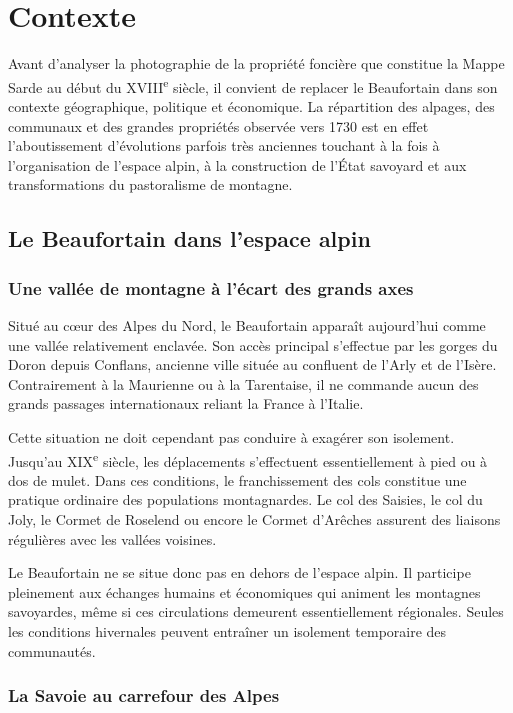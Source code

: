 \documentclass[12pt,a4paper]{report}
\begin{document}
	
\chapter{Contexte}

Avant d'analyser la photographie de la propriété foncière que constitue la Mappe Sarde au début du XVIII\textsuperscript{e} siècle, il convient de replacer le Beaufortain dans son contexte géographique, politique et économique. La répartition des alpages, des communaux et des grandes propriétés observée vers 1730 est en effet l'aboutissement d'évolutions parfois très anciennes touchant à la fois à l'organisation de l'espace alpin, à la construction de l'État savoyard et aux transformations du pastoralisme de montagne.

\section{Le Beaufortain dans l'espace alpin}

\subsection{Une vallée de montagne à l'écart des grands axes}

Situé au cœur des Alpes du Nord, le Beaufortain apparaît aujourd'hui comme une vallée relativement enclavée. Son accès principal s'effectue par les gorges du Doron depuis Conflans, ancienne ville située au confluent de l'Arly et de l'Isère. Contrairement à la Maurienne ou à la Tarentaise, il ne commande aucun des grands passages internationaux reliant la France à l'Italie.

Cette situation ne doit cependant pas conduire à exagérer son isolement. Jusqu'au XIX\textsuperscript{e} siècle, les déplacements s'effectuent essentiellement à pied ou à dos de mulet. Dans ces conditions, le franchissement des cols constitue une pratique ordinaire des populations montagnardes. Le col des Saisies, le col du Joly, le Cormet de Roselend ou encore le Cormet d'Arêches assurent des liaisons régulières avec les vallées voisines.

Le Beaufortain ne se situe donc pas en dehors de l'espace alpin. Il participe pleinement aux échanges humains et économiques qui animent les montagnes savoyardes, même si ces circulations demeurent essentiellement régionales. Seules les conditions hivernales peuvent entraîner un isolement temporaire des communautés.

\subsection{La Savoie au carrefour des Alpes}
\end{document}
